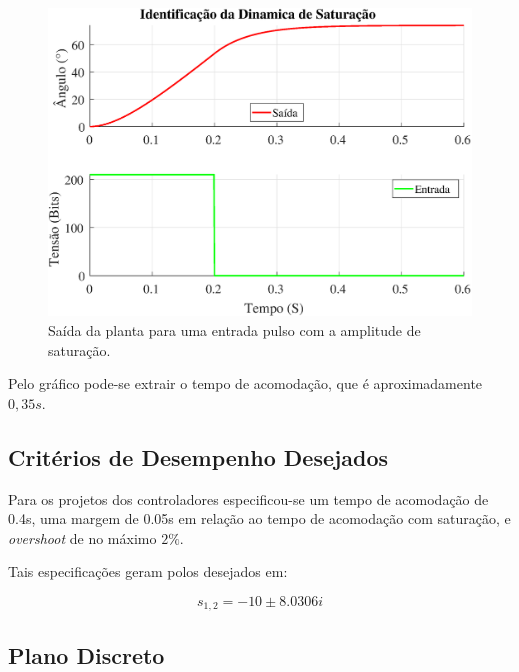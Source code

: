 \documentclass[conference,harvard,brazil,english]{sbatex}
\begin{document}
                \begin{figure}[!htb] 
                \centering \includegraphics[width=\columnwidth]{imagens/sat.eps}{
                    \small
                    \centering
                    \caption{Saída da planta para uma entrada pulso com a amplitude de saturação.}
                    \label{ZonaMorta}}
                \end{figure}
                
                Pelo gráfico pode-se extrair o tempo de acomodação, que é aproximadamente $0,35s$.
                
        \subsection{Critérios de Desempenho Desejados}
            
            Para os projetos dos controladores especificou-se um tempo de acomodação de 0.4s, uma margem de 0.05s em relação ao tempo de acomodação com saturação, e \textit{overshoot} de no máximo $2\%$.
            
            Tais especificações geram polos desejados em:
            
            \begin{equation}
                s_{1,2} = -10 \pm 8.0306i
            \end{equation}
                
        \subsection{Plano Discreto}
            
\end{document}
